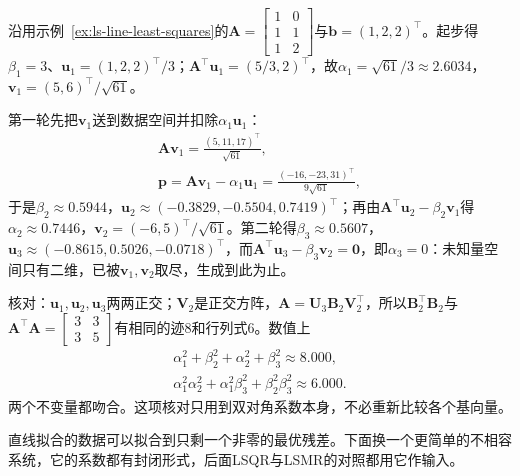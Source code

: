 \begin{example}[直线拟合上的两步双对角化]
\label{ex:ls-golub-kahan-line}
沿用示例~\ref{ex:ls-line-least-squares}的$\bm A=\left[\begin{smallmatrix}1&0\\1&1\\1&2\end{smallmatrix}\right]$与$\bm b=(1,2,2)^\top$。起步得$\beta_1=3$、$\bm u_1=(1,2,2)^\top/3$；$\bm A^\top\bm u_1=(5/3,2)^\top$，故$\alpha_1=\sqrt{61}/3\approx2.6034$，$\bm v_1=(5,6)^\top/\sqrt{61}$。

第一轮先把$\bm v_1$送到数据空间并扣除$\alpha_1\bm u_1$：
\[
 \begin{gathered}
 \bm A\bm v_1=\frac{(5,11,17)^\top}{\sqrt{61}},\\
 \bm p=\bm A\bm v_1-\alpha_1\bm u_1=\frac{(-16,-23,31)^\top}{9\sqrt{61}},
 \end{gathered}
\]
于是$\beta_2\approx0.5944$，$\bm u_2\approx(-0.3829,-0.5504,0.7419)^\top$；再由$\bm A^\top\bm u_2-\beta_2\bm v_1$得$\alpha_2\approx0.7446$，$\bm v_2=(-6,5)^\top/\sqrt{61}$。第二轮得$\beta_3\approx0.5607$，$\bm u_3\approx(-0.8615,0.5026,-0.0718)^\top$，而$\bm A^\top\bm u_3-\beta_3\bm v_2=\bm0$，即$\alpha_3=0$：未知量空间只有二维，已被$\bm v_1,\bm v_2$取尽，生成到此为止。

核对：$\bm u_1,\bm u_2,\bm u_3$两两正交；$\bm V_2$是正交方阵，$\bm A=\bm U_3\bm B_2\bm V_2^\top$，所以$\bm B_2^\top\bm B_2$与$\bm A^\top\bm A=\left[\begin{smallmatrix}3&3\\3&5\end{smallmatrix}\right]$有相同的迹$8$和行列式$6$。数值上
\[
 \begin{gathered}
 \alpha_1^2+\beta_2^2+\alpha_2^2+\beta_3^2\approx8.000,\\
 \alpha_1^2\alpha_2^2+\alpha_1^2\beta_3^2+\beta_2^2\beta_3^2\approx6.000 .
 \end{gathered}
\]
两个不变量都吻合。这项核对只用到双对角系数本身，不必重新比较各个基向量。
\end{example}

直线拟合的数据可以拟合到只剩一个非零的最优残差。下面换一个更简单的不相容系统，它的系数都有封闭形式，后面LSQR与LSMR的对照都用它作输入。


